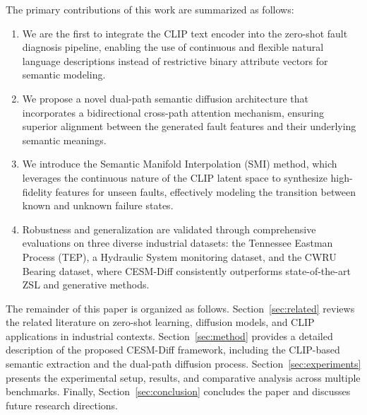 The primary contributions of this work are summarized as follows:
\begin{enumerate}
    \item We are the first to integrate the CLIP text encoder into the zero-shot fault diagnosis pipeline, enabling the use of continuous and flexible natural language descriptions instead of restrictive binary attribute vectors for semantic modeling.
    \item We propose a novel dual-path semantic diffusion architecture that incorporates a bidirectional cross-path attention mechanism, ensuring superior alignment between the generated fault features and their underlying semantic meanings.
    \item We introduce the Semantic Manifold Interpolation (SMI) method, which leverages the continuous nature of the CLIP latent space to synthesize high-fidelity features for unseen faults, effectively modeling the transition between known and unknown failure states.
    \item Robustness and generalization are validated through comprehensive evaluations on three diverse industrial datasets: the Tennessee Eastman Process (TEP), a Hydraulic System monitoring dataset, and the CWRU Bearing dataset, where CESM-Diff consistently outperforms state-of-the-art ZSL and generative methods.
\end{enumerate}

The remainder of this paper is organized as follows. Section~\ref{sec:related} reviews the related literature on zero-shot learning, diffusion models, and CLIP applications in industrial contexts. Section~\ref{sec:method} provides a detailed description of the proposed CESM-Diff framework, including the CLIP-based semantic extraction and the dual-path diffusion process. Section~\ref{sec:experiments} presents the experimental setup, results, and comparative analysis across multiple benchmarks. Finally, Section~\ref{sec:conclusion} concludes the paper and discusses future research directions.
